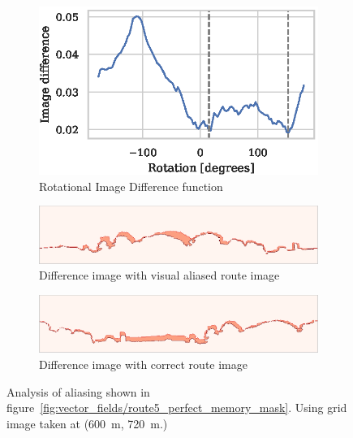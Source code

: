 \documentclass[letterpaper]{article}
\begin{document}
\begin{figure}[t]
    \begin{subfigure}[b]{\columnwidth}
        \includegraphics[width=\columnwidth]{figures/alias_ridf.eps}
        \caption{Rotational Image Difference function}
    \end{subfigure}
    
    \begin{subfigure}[b]{\columnwidth}
        \includegraphics[width=\columnwidth]{figures/image_diff_bad.png}
        \caption{Difference image with visual aliased route image}
    \end{subfigure}
    
    \begin{subfigure}[b]{\columnwidth}
        \includegraphics[width=\columnwidth]{figures/image_diff_good.png}
        \caption{Difference image with correct route image}
    \end{subfigure}
    \caption{Analysis of aliasing shown in figure~\ref{fig:vector_fields/route5_perfect_memory_mask}.
    Using grid image taken at (\SI{600}{\metre}, \SI{720}{\metre}.) }
\end{figure}
\end{document}
